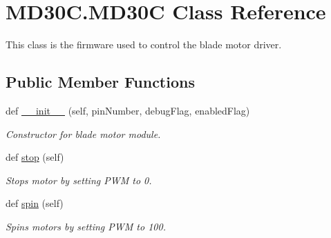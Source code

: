 \hypertarget{classMD30C_1_1MD30C}{}\section{M\+D30\+C.\+M\+D30C Class Reference}
\label{classMD30C_1_1MD30C}


This class is the firmware used to control the blade motor driver.  


\subsection*{Public Member Functions}
\begin{DoxyCompactItemize}
\item 
def \hyperlink{classMD30C_1_1MD30C_a6b934ae979dcc5fb8eb58775897bddec}{\+\_\+\+\_\+init\+\_\+\+\_\+} (self, pin\+Number, debug\+Flag, enabled\+Flag)
\begin{DoxyCompactList}\small\item\em Constructor for blade motor module. \end{DoxyCompactList}\item 
\mbox{\label{classMD30C_1_1MD30C_a6ab29bf40eaf050afcac82758a0eb41f}} 
def \hyperlink{classMD30C_1_1MD30C_a6ab29bf40eaf050afcac82758a0eb41f}{stop} (self)
\begin{DoxyCompactList}\small\item\em Stops motor by setting P\+WM to 0. \end{DoxyCompactList}\item 
\mbox{\label{classMD30C_1_1MD30C_a1d3d7ef88b94ec84c828c3167f06bd8e}} 
def \hyperlink{classMD30C_1_1MD30C_a1d3d7ef88b94ec84c828c3167f06bd8e}{spin} (self)
\begin{DoxyCompactList}\small\item\em Spins motors by setting P\+WM to 100. \end{DoxyCompactList}\end{DoxyCompactItemize}
